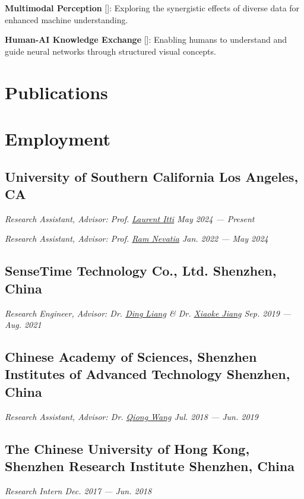 \documentclass[a4,10pt]{article}
\newcommand{\subtext}[1]{
#1\par\vspace{-0.2cm}}
\begin{document}
\textbf{Multimodal Perception} []:  Exploring the synergistic effects of diverse data for enhanced machine understanding.

\textbf{Human-AI Knowledge Exchange} []: Enabling humans to understand and guide neural networks through structured visual concepts.

\section{Publications} 
\renewcommand\refname{\vskip -1.5em}
\printbibliography[heading=none]

\section{Employment}

\subsection*{University of Southern California  \hfill Los Angeles, CA} 
\subtext{\textit{Research Assistant, Advisor: Prof. \href{http://ilab.usc.edu/itti/} {Laurent Itti}   \hfill May 2024 --- Present}}
\vspace{0.2cm}
\subtext{\textit{Research Assistant, Advisor: Prof. \href{https://sites.usc.edu/iris-cvlab/professor-ram-nevatia/} {Ram Nevatia}   \hfill Jan. 2022 --- May 2024}}
    
\subsection*{SenseTime Technology Co., Ltd.  \hfill Shenzhen, China} 
\subtext{\textit{Research Engineer, Advisor:  Dr. \href{https://scholar.google.com/citations?user=Dqjnn0gAAAAJ&hl=en} {Ding Liang} \& Dr. \href{https://shockjiang.github.io/} {Xiaoke Jiang}    \hfill Sep. 2019 --- Aug. 2021}}

\subsection*{Chinese Academy of Sciences, Shenzhen Institutes of Advanced Technology \hfill Shenzhen, China} 
\subtext{\textit{Research Assistant, Advisor: Dr. \href{https://dblp.org/pid/65/3144-1.html} {Qiong Wang}
    \hfill Jul. 2018 --- Jun. 2019}}

\subsection*{The Chinese University of Hong Kong, Shenzhen Research Institute \hfill Shenzhen, China} 
\subtext{\textit{Research Intern \hfill Dec. 2017 --- Jun. 2018} }
\end{document}

